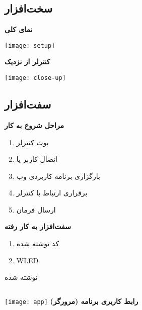 \documentclass{beamer}
\begin{document}
\subsection{سخت‌افزار}

\begin{frame}{\subsecname}{\secname}
  \textbf{نمای کلی}
  \vspace{1em}

  \texttt{[image: setup]}
\end{frame}

\begin{frame}{\subsecname}{\secname}
  \textbf{کنترلر از نزدیک}
  \vspace{1em}

  \texttt{[image: close-up]}
\end{frame}

\subsection{سفت‌افزار}

\begin{frame}{\subsecname}{\secname}
  \textbf{مراحل شروع به کار}

  \begin{enumerate}
    \item بوت کنترلر
    \item اتصال کاربر یا 
    \item بارگزاری برنامه کاربردی وب
    \item برقراری ارتباط با کنترلر
    \item ارسال فرمان
  \end{enumerate}
\end{frame}

\begin{frame}{\subsecname}{\secname}
  \textbf{سفت‌افزار به کار رفته}

  \begin{enumerate}
    \item کد نوشته شده
    \item WLED
  \end{enumerate}
\end{frame}

\begin{frame}{\subsecname{} نوشته شده}{\secname}
  \begin{columns}
    \texttt{[image: app]}
    \centering\textbf{رابط کاربری برنامه (مرورگر)}
  \end{columns}
\end{frame}
\end{document}
